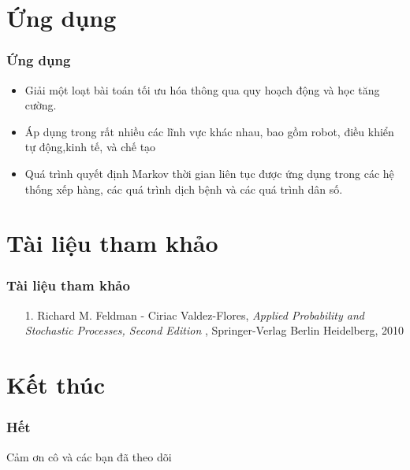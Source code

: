 \documentclass[12pt]{beamer}
\begin{document}
\section{Ứng dụng}
\begin{frame}
	\frametitle{Ứng dụng}
	\begin{itemize}
	\item
	Giải một loạt bài toán tối ưu hóa thông qua quy hoạch động và học tăng cường.
	\item
	Áp dụng trong rất nhiều các lĩnh vực khác nhau, bao gồm robot, điều khiển tự động,kinh tế, và chế tạo
	\item
	Quá trình quyết định Markov thời gian liên tục được ứng dụng trong các hệ thống xếp hàng, các quá trình dịch bệnh và các quá trình dân số.
	\end{itemize}
\end{frame}

\section*{Tài liệu tham khảo}
\begin{frame}
	\frametitle{Tài liệu tham khảo}
   \begin{itemize}
   	\item[1.] Richard M. Feldman - Ciriac Valdez-Flores, \textit{Applied Probability and Stochastic Processes, Second Edition} , Springer-Verlag Berlin Heidelberg, 2010
	\end{itemize}
\end{frame}



\section*{Kết thúc}
\begin{frame}
\frametitle{Hết}
\center
\huge
\color{red}
 Cảm ơn cô và các bạn đã theo dõi
\end{frame}
\end{document}
